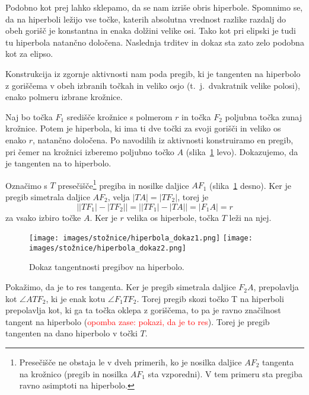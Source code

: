 Podobno kot prej lahko sklepamo, da se nam izriše obris hiperbole. Spomnimo se, da na hiperboli ležijo vse točke, katerih absolutna vrednost razlike razdalj do obeh gorišč je konstantna in enaka dolžini velike osi. Tako kot pri elipski je tudi tu hiperbola natančno določena. Naslednja trditev in dokaz sta zato zelo podobna kot za elipso.

\begin{trditev}
    Konstrukcija iz zgornje aktivnosti nam poda pregib, ki je tangenten na hiperbolo z goriščema v obeh izbranih točkah in veliko osjo (t.\ j.\ dvakratnik velike polosi), enako polmeru izbrane krožnice.
\end{trditev}

\begin{dokaz}
    Naj bo točka $F_1$ središče krožnice s polmerom $r$ in točka $F_2$ poljubna točka zunaj krožnice. Potem je hiperbola, ki ima ti dve točki za svoji gorišči in veliko os enako $r$, natančno določena. Po navodilih iz aktivnosti konstruiramo en pregib, pri čemer na krožnici izberemo poljubno točko $A$ (slika~\ref{fig:dokaz_hiperbola} levo). Dokazujemo, da je tangenten na to hiperbolo.

    Označimo s $T$ presečišče\footnote{Presečišče ne obstaja le v dveh primerih, ko je nosilka daljice $AF_2$ tangenta na krožnico (pregib in nosilka $AF_1$ sta vzporedni). V tem primeru sta pregiba ravno asimptoti na hiperbolo.} pregiba in nosilke daljice $AF_1$ (slika~\ref{fig:dokaz_hiperbola} desno). Ker je pregib simetrala daljice $AF_2$, velja $|TA| = |TF_2|$, torej je 
    $$\left||TF_1| - |TF_2|\right| = \left||TF_1| - |TA|\right| = |F_1A| = r$$
    za vsako izbiro točke $A$. Ker je $r$ velika os hiperbole, točka $T$ leži na njej.

    \begin{figure}[h]
        \centering
        \texttt{[image: images/stožnice/hiperbola\_dokaz1.png]}
        \texttt{[image: images/stožnice/hiperbola\_dokaz2.png]}
        \caption[Tangentnost na hiperbolo]{Dokaz tangentnosti pregibov na hiperbolo.}
        \label{fig:dokaz_hiperbola}
    \end{figure}

    Pokažimo, da je to res tangenta. Ker je pregib simetrala daljice $F_2A$,  prepolavlja kot $\angle ATF_2$, ki je enak kotu $\angle F_1TF_2$. Torej pregib skozi točko T na hiperboli prepolavlja kot, ki ga ta točka oklepa z goriščema, to pa je ravno značilnost tangent na hiperbolo (\textcolor{red}{opomba zase: pokazi, da je to res}). Torej je pregib tangenten na dano hiperbolo v točki $T$.
\end{dokaz}


